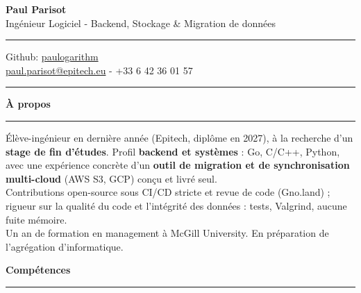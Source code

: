 \documentclass[9pt]{extarticle}
\begin{document}
\begin{center}
	{\huge\bfseries Paul Parisot}
	\\[4pt]
	{\Large Ingénieur Logiciel - Backend, Stockage \& Migration de données}
	\\
\end{center}

\par\vspace{-5pt}
\rule{\linewidth}{0.4pt}
\par\vspace{-5pt}

\begin{center}
	Github: \href{https://github.com/paulogarithm}{paulogarithm}
	\\
	\href{mailto:paul.parisot@epitech.eu}{paul.parisot@epitech.eu} - +33 6 42 36 01 57
	\\
\end{center}

\par\vspace{-10pt}
\rule{\linewidth}{0.4pt}
\par\vspace{7pt}

{\large\bfseries À propos}
\par\vspace{-8pt}
\rule{\linewidth}{0.4pt}
\par\vspace{5pt}

Élève-ingénieur en dernière année (Epitech, diplôme en 2027), à la recherche d'un {\bfseries stage de fin d'études}. Profil {\bfseries backend et systèmes} : Go, C/C++, Python, avec une expérience concrète d'un {\bfseries outil de migration et de synchronisation multi-cloud} (AWS S3, GCP) conçu et livré seul.
\\
Contributions open-source sous CI/CD stricte et revue de code (Gno.land) ; rigueur sur la qualité du code et l'intégrité des données : tests, Valgrind, aucune fuite mémoire.
\\
Un an de formation en management à McGill University. En préparation de l'agrégation d'informatique.
\par\vspace{5pt}

{\large\bfseries Compétences}
\par\vspace{-8pt}
\rule{\linewidth}{0.4pt}
\par\vspace{5pt}
\end{document}
